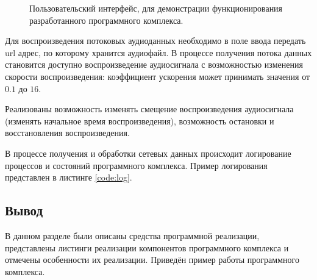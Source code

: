 \begin{figure}[!h]
            \caption{Пользовательский интерфейс, для демонстрации функционирования разработанного программного комплекса.}
            \label{fig:software-ui}
        \end{figure}

        \par Для воспроизведения потоковых аудиоданных необходимо в поле ввода передать url адрес, 
        по которому хранится аудиофайл. В процессе получения потока данных становится доступно воспроизведение аудиосигнала
        с возможностью изменения скорости воспроизведения: коэффициент ускорения может принимать значения от $0.1$ до $16$.

        \par Реализованы возможность изменять смещение воспроизведения аудиосигнала (изменять начальное время воспроизведения),
        возможность остановки и восстановления воспроизведения.
        
        \par В процессе получения и обработки сетевых данных происходит логирование процессов и состояний программного комплекса.
        Пример логирования представлен в листинге \ref{code:log}.

        
    
    \subsection*{Вывод}
        \par В данном разделе были описаны средства программной реализации, 
        представлены листинги реализации компонентов программного комплекса и отмечены особенности их реализации.
        Приведён пример работы программного комплекса.

\pagebreak